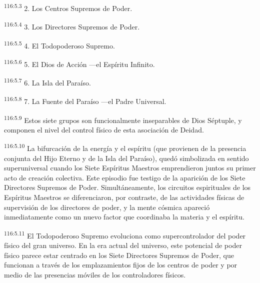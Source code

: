 \documentclass[twoside, 11pt]{book}
\begin{document}
\par
\textsuperscript{116:5.3} 2. Los Centros Supremos de Poder.

\par
\textsuperscript{116:5.4} 3. Los Directores Supremos de Poder.

\par
\textsuperscript{116:5.5} 4. El Todopoderoso Supremo.

\par
\textsuperscript{116:5.6} 5. El Dios de Acción ---el Espíritu Infinito.

\par
\textsuperscript{116:5.7} 6. La Isla del Paraíso.

\par
\textsuperscript{116:5.8} 7. La Fuente del Paraíso ---el Padre Universal.

\par
\textsuperscript{116:5.9} Estos siete grupos son funcionalmente inseparables de Dios Séptuple, y componen el nivel del control físico de esta asociación de Deidad.

\par
\textsuperscript{116:5.10} La bifurcación de la energía y el espíritu (que provienen de la presencia conjunta del Hijo Eterno y de la Isla del Paraíso), quedó simbolizada en sentido superuniversal cuando los Siete Espíritus Maestros emprendieron juntos su primer acto de creación colectiva. Este episodio fue testigo de la aparición de los Siete Directores Supremos de Poder. Simultáneamente, los circuitos espirituales de los Espíritus Maestros se diferenciaron, por contraste, de las actividades físicas de supervisión de los directores de poder, y la mente cósmica apareció inmediatamente como un nuevo factor que coordinaba la materia y el espíritu.

\par
\textsuperscript{116:5.11} El Todopoderoso Supremo evoluciona como supercontrolador del poder físico del gran universo. En la era actual del universo, este potencial de poder físico parece estar centrado en los Siete Directores Supremos de Poder, que funcionan a través de los emplazamientos fijos de los centros de poder y por medio de las presencias móviles de los controladores físicos.
\end{document}
